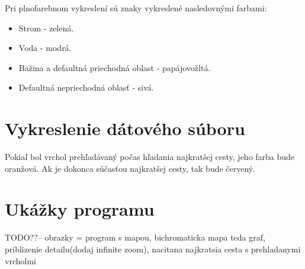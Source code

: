 Pri plnofarebnom vykreslení sú znaky vykreslené nasledovnými farbami:
\begin{itemize}
\item Strom - zelená.
\item Voda - modrá.
\item Bažina a defaultná priechodná oblast - papájovožltá.
\item Defaultná nepriechodná oblasť - sivá.
\end{itemize}


\section{Vykreslenie dátového súboru}
Pokiaľ bol vrchol prehľadávaný počas hľadania najkratšej cesty, jeho farba bude oranžová. Ak je dokonca súčasťou najkratšej cesty, 
tak bude červený.

\section{Ukážky programu}

TODO??-- obrazky = program s mapou, bichromaticka mapa teda graf, priblizenie detailu(dodaj infinite zoom), nacitana najkratsia cesta s prehladanymi vrcholmi
